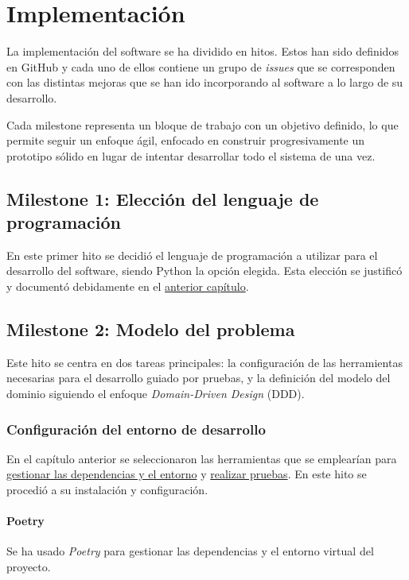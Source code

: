 \chapter{Implementación}

La implementación del software se ha dividido en hitos. Estos han sido definidos en GitHub
y cada uno de ellos contiene un grupo de \textit{issues} que se corresponden con las distintas
mejoras que se han ido incorporando al software a lo largo de su desarrollo.

Cada milestone representa un bloque de trabajo con un objetivo definido, lo que permite seguir
un enfoque ágil, enfocado en construir progresivamente un prototipo sólido en lugar de intentar
desarrollar todo el sistema de una vez. 

\section{Milestone 1: Elección del lenguaje de programación}
En este primer hito se decidió el lenguaje de programación a utilizar para el desarrollo del software,
siendo Python la opción elegida. Esta elección se justificó y documentó debidamente en el
\hyperref[sec:lenguaje-programación]{anterior capítulo}.

\section{Milestone 2: Modelo del problema}
Este hito se centra en dos tareas principales: la configuración de las herramientas necesarias para
el desarrollo guiado por pruebas, y la definición del modelo del dominio siguiendo el enfoque 
\textit{Domain-Driven Design} (DDD).

\subsection{Configuración del entorno de desarrollo}
En el capítulo anterior se seleccionaron las herramientas que se emplearían para 
\hyperref[sec:gestor-dependencias]{gestionar las dependencias y el entorno} y 
\hyperref[sec:herramienta-testeo]{realizar pruebas}. En este hito se procedió a su instalación y 
configuración.

\subsubsection{Poetry}
Se ha usado \textit{Poetry} para gestionar las dependencias y el entorno virtual del proyecto.

